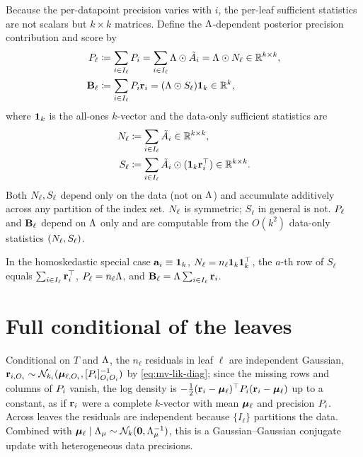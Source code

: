 Because the per-datapoint precision varies with $i$, the per-leaf sufficient
statistics are not scalars but $k\times k$ matrices. Define the
$\Lambda$-dependent posterior precision contribution and score by
\begin{align}
	\label{eq:mv-precision-sum}
	P_\ell & \coloneqq \sum_{i \in I_\ell}P_i
	= \sum_{i \in I_\ell}\Lambda \odot \tilde{A}_i
	= \Lambda \odot N_\ell
	 \in \mathbb{R}^{k\times k},
	\\
	\label{eq:mv-suffstats-B}
	\mathbf{B}_\ell & \coloneqq \sum_{i \in I_\ell}P_i \mathbf{r}_i
	= (\Lambda \odot S_\ell) \mathbf{1}_k
	 \in \mathbb{R}^{k},
\end{align}
where $\mathbf{1}_k$ is the all-ones $k$-vector and the data-only sufficient
statistics are
\begin{align}
	\label{eq:mv-suffstats-N}
	N_\ell & \coloneqq \sum_{i \in I_\ell}\tilde{A}_i
	 \in \mathbb{R}^{k\times k},
	\\
	\label{eq:mv-suffstats-S}
	S_\ell   & \coloneqq \sum_{i \in I_\ell}\tilde{A}_i \odot (\mathbf{1}_k \mathbf{r}_i^\top)
	 \in \mathbb{R}^{k\times k}.
\end{align}
Both $N_\ell, S_\ell$ depend only on the data (not on $\Lambda$) and
accumulate additively across any partition of the index set. $N_\ell$ is
symmetric; $S_\ell$ in general is not. $P_\ell$ and $\mathbf{B}_\ell$ depend on
$\Lambda$ only and are computable from the $O(k^2)$ data-only statistics
$(N_\ell, S_\ell)$.

In the homoskedastic special case $\mathbf{a}_i \equiv \mathbf{1}_k$,
$N_\ell = n_\ell \mathbf{1}_k\mathbf{1}_k^\top$, the $a$-th row of $S_\ell$ equals
$\sum_{i \in I_\ell}\mathbf{r}_i^\top$, $P_\ell = n_\ell \Lambda$, and
$\mathbf{B}_\ell = \Lambda\sum_{i \in I_\ell}\mathbf{r}_i$.

\section{Full conditional of the leaves}
\label{sec:mv-full-cond}

Conditional on $T$ and $\Lambda$, the $n_\ell$ residuals in leaf $\ell$ are
independent Gaussian,
$\mathbf{r}_{i,O_i} \sim \mathcal{N}_{k_i}(\bm{\mu}_{\ell,O_i}, [P_i]_{O_iO_i}^{-1})$ by
\eqref{eq:mv-lik-diag}; since the missing rows and columns of $P_i$
vanish, the log density is
$-\frac{1}{2}(\mathbf{r}_i - \bm{\mu}_\ell)^\top P_i(\mathbf{r}_i - \bm{\mu}_\ell)$ up to a
constant, as if $\mathbf{r}_i$ were a complete $k$-vector with mean $\bm{\mu}_\ell$ and
precision $P_i$. Across leaves the residuals are independent because
$\{I_\ell\}$ partitions the data. Combined with
$\bm{\mu}_\ell \mid \Lambda_{\mu} \sim \mathcal{N}_k(\mathbf{0}, \Lambda_{\mu}^{-1})$, this is a
Gaussian--Gaussian conjugate update with heterogeneous data precisions.

